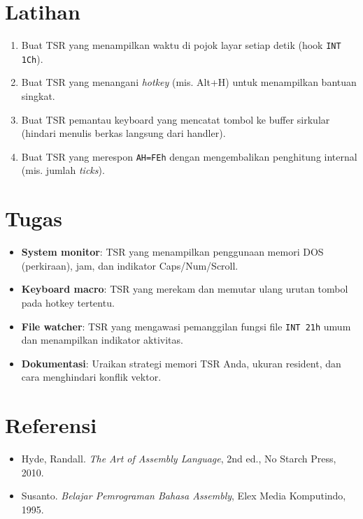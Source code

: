 \section{Latihan}
\begin{enumerate}
  \item Buat TSR yang menampilkan waktu di pojok layar setiap detik (hook \texttt{INT 1Ch}).
  \item Buat TSR yang menangani \textit{hotkey} (mis. Alt+H) untuk menampilkan bantuan singkat.
  \item Buat TSR pemantau keyboard yang mencatat tombol ke buffer sirkular (hindari menulis berkas langsung dari handler).
  \item Buat TSR yang merespon \texttt{AH=FEh} dengan mengembalikan penghitung internal (mis. jumlah \textit{ticks}).
\end{enumerate}

\section{Tugas}
\begin{itemize}
  \item \textbf{System monitor}: TSR yang menampilkan penggunaan memori DOS (perkiraan), jam, dan indikator Caps/Num/Scroll.
  \item \textbf{Keyboard macro}: TSR yang merekam dan memutar ulang urutan tombol pada hotkey tertentu.
  \item \textbf{File watcher}: TSR yang mengawasi pemanggilan fungsi file \texttt{INT 21h} umum dan menampilkan indikator aktivitas.
  \item \textbf{Dokumentasi}: Uraikan strategi memori TSR Anda, ukuran resident, dan cara menghindari konflik vektor.
\end{itemize}

\section{Referensi}
\begin{itemize}
  \item Hyde, Randall. \textit{The Art of Assembly Language}, 2nd ed., No Starch Press, 2010.
  \item Susanto. \textit{Belajar Pemrograman Bahasa Assembly}, Elex Media Komputindo, 1995.
\end{itemize}
